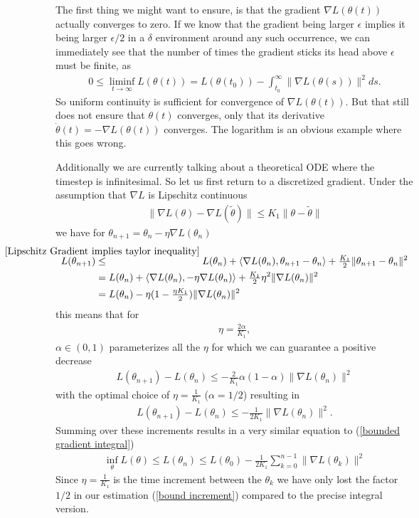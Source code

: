 The first thing we might want to ensure, is that the gradient \(\nabla L(\theta(t))\)
actually converges to zero. If we know that the gradient being larger \(\epsilon\)
implies it being larger \(\epsilon/2\) in a \(\delta\) environment around any
such occurrence, we can immediately see that the number of times the gradient
sticks its head above \(\epsilon\) must be finite, as
%
\begin{align}\label{bounded gradient integral}
	0 \le \liminf_{t\to\infty} L(\theta(t))
	=  L(\theta(t_0)) - \int_{t_0}^\infty \|\nabla L(\theta(s))\|^2 ds.
\end{align}
%
So uniform continuity is sufficient for convergence of \(\nabla L(\theta(t))\).
But that still does not ensure that \(\theta(t)\) converges, only that its
derivative \(\dot{\theta}(t) = -\nabla L(\theta(t))\) converges. The logarithm
is an obvious example where this goes wrong.

Additionally we are currently talking about a theoretical ODE where the timestep
is infinitesimal. So let us first return to a discretized gradient. Under the
assumption that \(\nabla L\) is Lipschitz continuous
%
\begin{align*}
	\| \nabla L(\theta) - \nabla L(\tilde{\theta})\| \le K_1 \|\theta-\tilde{\theta}\|
\end{align*}
%
we have for \(\theta_{n+1}=\theta_n-\eta\nabla L(\theta_n)\)
%
\begin{align}
	L(\theta_{n+1})
	&\lxle{\ref{Lipschitz Gradient implies taylor inequality}} L(\theta_n) 
	+ \langle\nabla L(\theta_n),\theta_{n+1} - \theta_n\rangle
	+ \tfrac{K_1}{2} \| \theta_{n+1} - \theta_n\|^2 
	\label{bound increment}\\
	&= L(\theta_n)
	+ \langle\nabla L(\theta_n), -\eta\nabla L(\theta_n)\rangle
	+ \tfrac{K_1}{2}\eta^2\| \nabla L(\theta_n)\|^2
	\nonumber\\
	&=L(\theta_n) - \eta(1-\tfrac{\eta K_1}{2})\|\nabla L(\theta_n)\|^2
	\nonumber
\end{align}
%
this means that for
\begin{align}\label{learning rate restrictions}
	\eta=\tfrac{2\alpha}{K_1},
\end{align}
%
\(\alpha \in (0,1)\) parameterizes all the \(\eta\) for which we can guarantee
a positive decrease
%
\begin{align*}
	L(\theta_{n+1}) - L(\theta_n)
	\le - \tfrac{2}{K_1}\alpha (1-\alpha)\|\nabla L(\theta_n)\|^2
\end{align*}
%
with the optimal choice of \(\eta=\tfrac{1}{K_1}\) (\(\alpha=1/2\)) resulting
in 
%
\begin{align*}
	L(\theta_{n+1}) - L(\theta_n)
	\le - \tfrac{1}{2K_1}\|\nabla L(\theta_n)\|^2.
\end{align*}
%
Summing over these increments results in a very similar equation to
(\ref{bounded gradient integral})
%
\begin{align*}
	\inf_{\theta} L(\theta) \le L(\theta_n) 
	\le L(\theta_0) - \tfrac{1}{2K_1} \sum_{k=0}^{n-1}\|\nabla L(\theta_k)\|^2
\end{align*}
%
Since \(\eta=\tfrac{1}{K_1}\) is the time increment between the \(\theta_k\)
we have only lost the factor \(1/2\) in our estimation (\ref{bound increment})
compared to the precise integral version.

